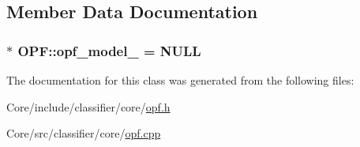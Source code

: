 \subsection{Member Data Documentation}
\hypertarget{classOPF_a906ed713cbe0d20ffb96d064f4db42c1}{
\subsubsection[{opf\+\_\+model\+\_\+}]{$\ast$ O\+P\+F\+::opf\+\_\+model\+\_\+ = N\+U\+L\+L\hspace{0.3cm}{\ttfamily [private]}}}\label{classOPF_a906ed713cbe0d20ffb96d064f4db42c1}


The documentation for this class was generated from the following files\+:\begin{DoxyCompactItemize}
\item 
Core/include/classifier/core/\hyperlink{opf_8h}{opf.\+h}\item 
Core/src/classifier/core/\hyperlink{opf_8cpp}{opf.\+cpp}\end{DoxyCompactItemize}
